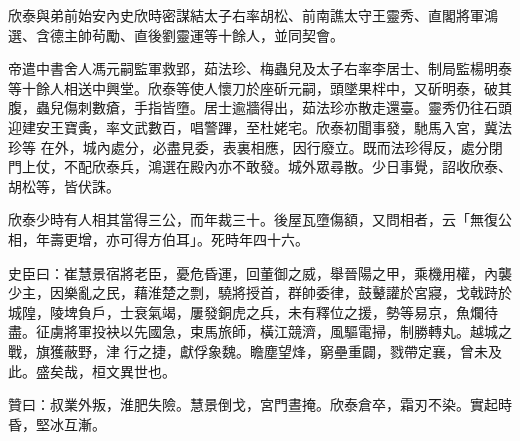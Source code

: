 \begin{pinyinscope}
 欣泰與弟前始安內史欣時密謀結太子右率胡松、前南譙太守王靈秀、直閣將軍鴻選、含德主帥茍勵、直後劉靈運等十餘人，並同契會。



 帝遣中書舍人馮元嗣監軍救郢，茹法珍、梅蟲兒及太子右率李居士、制局監楊明泰等十餘人相送中興堂。欣泰等使人懷刀於座斫元嗣，頭墜果柈中，又斫明泰，破其腹，蟲兒傷刺數瘡，手指皆墮。居士逾牆得出，茹法珍亦散走還臺。靈秀仍往石頭迎建安王寶夤，率文武數百，唱警蹕，至杜姥宅。欣泰初聞事發，馳馬入宮，冀法珍等
 在外，城內處分，必盡見委，表裏相應，因行廢立。既而法珍得反，處分閉門上仗，不配欣泰兵，鴻選在殿內亦不敢發。城外眾尋散。少日事覺，詔收欣泰、胡松等，皆伏誅。



 欣泰少時有人相其當得三公，而年裁三十。後屋瓦墮傷額，又問相者，云「無復公相，年壽更增，亦可得方伯耳」。死時年四十六。



 史臣曰：崔慧景宿將老臣，憂危昏運，回董御之威，舉晉陽之甲，乘機用權，內襲少主，因樂亂之民，藉淮楚之剽，驍將授首，群帥委律，鼓鼙讙於宮寢，戈戟跱於城隍，陵埤負戶，士衰氣竭，屢發銅虎之兵，未有釋位之援，勢等易京，魚爛待盡。征虜將軍投袂以先國急，束馬旅師，橫江競濟，風驅電掃，制勝轉丸。越城之戰，旗獲蔽野，津行之捷，獻俘象魏。瞻塵望烽，窮壘重闢，戮帶定襄，曾未及此。盛矣哉，桓文異世也。



 贊曰：叔業外叛，淮肥失險。慧景倒戈，宮門晝掩。欣泰倉卒，霜刃不染。實起時昏，堅冰互漸。



\end{pinyinscope}